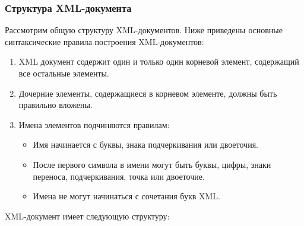\documentclass[12pt,a4paper,oneside]{article} %
\begin{document}
\newpage
\subsubsection{Структура XML-документа}	

Рассмотрим общую структуру XML-документов. Ниже приведены основные\linebreak
синтаксические правила построения XML-документов:

\begin{enumerate}
\item XML документ содержит один и только один корневой элемент, \linebreak
содержащий все остальные элементы.

\item Дочерние элементы, содержащиеся в корневом элементе, должны \linebreak
быть правильно вложены.

\item Имена элементов подчиняются правилам:
\begin{itemize}
\item Имя начинается с буквы, знака подчеркивания или двоеточия.
\item	После первого символа в имени могут быть буквы, цифры, знаки\linebreak
переноса, подчеркивания, точка или двоеточие.
\item	Имена не могут начинаться с сочетания букв XML.
\end{itemize}
\end{enumerate}

XML-документ имеет следующую структуру:
\end{document}
